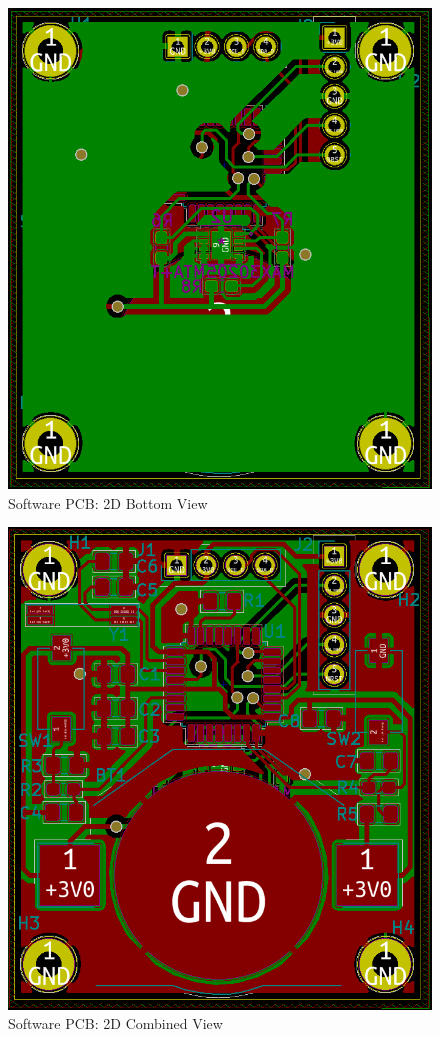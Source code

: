 \begin{figure}[H]
	\centering
	\includegraphics[scale=0.4]{img/PCB-Bottom.PNG}
	\caption{Software PCB: 2D Bottom View}
	\label{PCB-Bottom}
\end{figure}
\begin{figure}[H]
	\centering
	\includegraphics[scale=0.4]{img/PCB-Comp.PNG}
	\caption{Software PCB: 2D Combined View}
	\label{PCB-Comb}
\end{figure}
